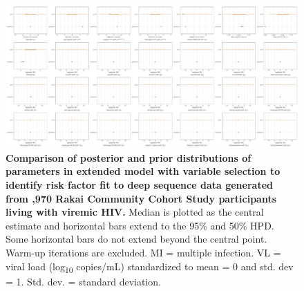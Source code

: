 \documentclass[10pt,letterpaper]{article}
\begin{document}
\begin{figure}[!ht]
 \includegraphics[width=1\textwidth]{../../figures/empirical_var_select_prior.pdf}
\caption{{\bf Comparison of posterior and prior distributions of parameters in extended model with variable selection to identify risk factor fit to deep sequence data generated from ,970 Rakai Community Cohort Study participants living with viremic HIV.} Median is plotted as the central estimate and horizontal bars extend to the 95\% and 50\% HPD. Some horizontal bars do not extend beyond the central point. Warm-up iterations are excluded. MI = multiple infection. VL = viral load (log\textsubscript{10} copies/mL) standardized to mean = 0 and std. dev = 1. Std. dev. = standard deviation. }
\end{figure}
\end{document}
